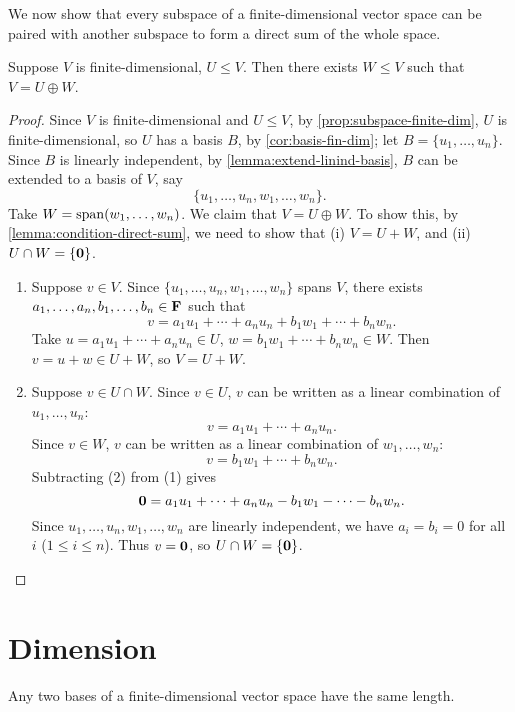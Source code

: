 We now show that every subspace of a finite-dimensional vector space can be paired with another subspace to form a direct sum of the whole space.

\begin{corollary}
Suppose $V$ is finite-dimensional, $U\le V$. Then there exists $W\le V$ such that $V=U\oplus W$.
\end{corollary}

\begin{proof}
Since $V$ is finite-dimensional and $U\le V$, by \cref{prop:subspace-finite-dim}, $U$ is finite-dimensional, so $U$ has a basis $B$, by \cref{cor:basis-fin-dim}; let $B=\{u_1,\dots,u_n\}$. Since $B$ is linearly independent, by \cref{lemma:extend-linind-basis}, $B$ can be extended to a basis of $V$, say
\[\{u_1,\dots,u_n,w_1,\dots,w_n\}.\]
Take $W=\operatorname{span}(w_1,\dots,w_n)$. We claim that $V=U\oplus W$. To show this, by \cref{lemma:condition-direct-sum}, we need to show that (i) $V=U+W$, and (ii) $U\cap W=\{\vb{0}\}$.
\begin{enumerate}[label=(\roman*)]
\item Suppose $v\in V$. Since $\{u_1,\dots,u_n,w_1,\dots,w_n\}$ spans $V$, there exists $a_1,\dots,a_n,b_1,\dots,b_n\in\mathbf F$ such that
\[v=a_1u_1+\cdots+a_nu_n+b_1w_1+\cdots+b_nw_n.\]
Take $u=a_1u_1+\cdots+a_nu_n\in U$, $w=b_1w_1+\cdots+b_nw_n\in W$. Then $v=u+w\in U+W$, so $V=U+W$.
\item Suppose $v\in U\cap W$. Since $v\in U$, $v$ can be written as a linear combination of $u_1,\dots,u_n$:
\begin{equation*}\tag{1}
v=a_1u_1+\cdots+a_nu_n.
\end{equation*}
Since $v\in W$, $v$ can be written as a linear combination of $w_1,\dots,w_n$:
\begin{equation*}\tag{2}
v=b_1w_1+\cdots+b_nw_n.
\end{equation*}
Subtracting (2) from (1) gives
\[\vb{0}=a_1u_1+\cdots+a_nu_n-b_1w_1-\cdots-b_nw_n.\]
Since $u_1,\dots,u_n,w_1,\dots,w_n$ are linearly independent, we have $a_i=b_i=0$ for all $i$ ($1\le i\le n$). Thus $v=\vb{0}$, so $U\cap W=\{\vb{0}\}$.
\end{enumerate}
\end{proof}
\pagebreak

\section{Dimension}
\begin{lemma}
Any two bases of a finite-dimensional vector space have the same length.
\end{lemma}

